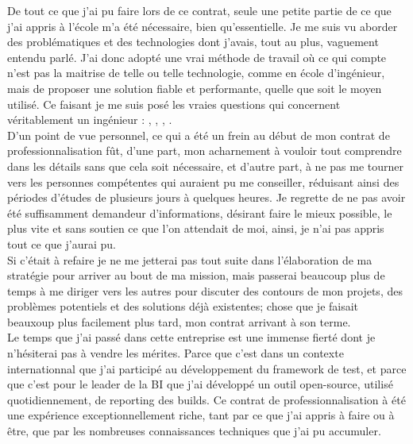 De tout ce que j'ai pu faire lors de ce contrat, seule une petite partie de ce que j'ai appris \`{a} l'\'{e}cole m'a \'{e}t\'{e} n\'{e}cessaire, bien qu'essentielle. Je me suis vu aborder des probl\'{e}matiques et des technologies dont j'avais, tout au plus, vaguement entendu parl\'{e}. J'ai donc adopt\'{e} une vrai m\'{e}thode de travail o\`{u} ce qui compte n'est pas la maitrise de telle ou telle technologie, comme en \'{e}cole d'ing\'{e}nieur, mais de proposer une solution fiable et performante, quelle que soit le moyen utilis\'{e}. Ce faisant je me suis pos\'{e} les vraies questions qui concernent v\'{e}ritablement un ing\'{e}nieur : , , , .\\






D'un point de vue personnel, ce qui a \'{e}t\'{e} un frein au d\'{e}but de mon contrat de professionnalisation f\^{u}t, d'une part, mon acharnement \`{a} vouloir tout comprendre dans les d\'{e}tails sans que cela soit n\'{e}cessaire, et d'autre part, \`{a} ne pas me tourner vers les personnes comp\'{e}tentes qui auraient pu me conseiller, r\'{e}duisant ainsi des p\'{e}riodes d'\'{e}tudes de plusieurs jours \`{a} quelques heures. Je regrette de ne pas avoir \'{e}t\'{e} suffisamment demandeur d'informations, d\'{e}sirant faire le mieux possible, le plus vite et sans soutien ce que l'on attendait de moi, ainsi, je n'ai pas appris tout ce que j'aurai pu.\\

Si c'\'{e}tait \`{a} refaire je ne me jetterai pas tout suite dans l'\'{e}laboration de ma strat\'{e}gie pour arriver au bout de ma mission, mais passerai beaucoup plus de temps \`{a} me diriger vers les autres pour discuter des contours de mon projets, des probl\`{e}mes potentiels et des solutions d\'{e}j\`{a} existentes; chose que je faisait beauxoup plus facilement plus tard, mon contrat arrivant \`{a} son terme.\\


Le temps que j'ai pass\'{e} dans cette entreprise est une immense fiert\'{e} dont je n'h\'{e}siterai pas \`{a} vendre les m\'{e}rites. Parce que c'est dans un contexte internationnal que j'ai particip\'{e} au d\'{e}veloppement du framework de test, et parce que c'est pour le leader de la BI que j'ai d\'{e}velopp\'{e} un outil open-source, utilis\'{e} quotidiennement, de reporting des builds. Ce contrat de professionnalisation \`{a} \'{e}t\'{e} une exp\'{e}rience exceptionnellement riche, tant par ce que j'ai appris \`{a} faire ou \`{a} \^{e}tre, que par les nombreuses connaissances techniques que j'ai pu accumuler. 



